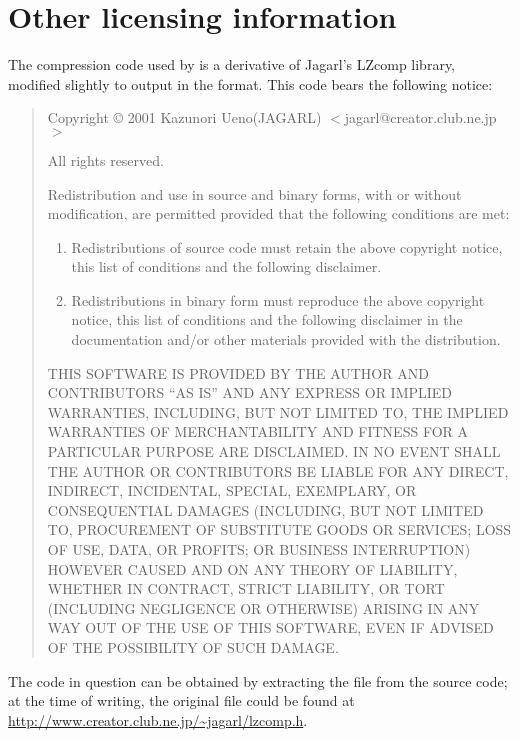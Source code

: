 \chapter{Other licensing information}

The compression code used by \package{} is a derivative of Jagarl's LZcomp
library, modified slightly to output in the \reallive{} format.  This code bears
the following notice:
\begin{quote}\small
  Copyright \copyright{} 2001 Kazunori Ueno(JAGARL) $<$jagarl@creator.club.ne.jp$>$

  All rights reserved.

  Redistribution and use in source and binary forms, with or without
  modification, are permitted provided that the following conditions
  are met:

  \begin{enumerate}
  \item
    Redistributions of source code must retain the above copyright
    notice, this list of conditions and the following disclaimer.
  \item
    Redistributions in binary form must reproduce the above copyright
    notice, this list of conditions and the following disclaimer in the
    documentation and/or other materials provided with the distribution.
  \end{enumerate}

  THIS SOFTWARE IS PROVIDED BY THE AUTHOR AND CONTRIBUTORS ``AS IS'' AND
  ANY EXPRESS OR IMPLIED WARRANTIES, INCLUDING, BUT NOT LIMITED TO, THE
  IMPLIED WARRANTIES OF MERCHANTABILITY AND FITNESS FOR A PARTICULAR PURPOSE
  ARE DISCLAIMED.  IN NO EVENT SHALL THE AUTHOR OR CONTRIBUTORS BE LIABLE
  FOR ANY DIRECT, INDIRECT, INCIDENTAL, SPECIAL, EXEMPLARY, OR CONSEQUENTIAL
  DAMAGES (INCLUDING, BUT NOT LIMITED TO, PROCUREMENT OF SUBSTITUTE GOODS
  OR SERVICES; LOSS OF USE, DATA, OR PROFITS; OR BUSINESS INTERRUPTION)
  HOWEVER CAUSED AND ON ANY THEORY OF LIABILITY, WHETHER IN CONTRACT, STRICT
  LIABILITY, OR TORT (INCLUDING NEGLIGENCE OR OTHERWISE) ARISING IN ANY WAY
  OUT OF THE USE OF THIS SOFTWARE, EVEN IF ADVISED OF THE POSSIBILITY OF
  SUCH DAMAGE.
\end{quote}
\noindent
The code in question can be obtained by extracting the file
 from the \package{} source code; at the time of
writing, the original file could be found at
\mbox{\url{http://www.creator.club.ne.jp/~jagarl/lzcomp.h}}.
